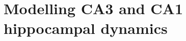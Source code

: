 \documentclass[../main.tex]{subfiles}
\begin{document}
\chapter{Modelling CA3 and CA1 hippocampal dynamics}




\end{document}
